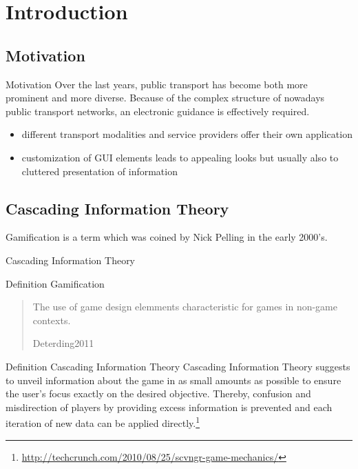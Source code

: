 \section{Introduction}
\subsection{Motivation}

\begin{frame}{Motivation}
Over the last years, public transport has become both more prominent and more diverse. Because of the complex structure of nowadays public transport networks, an electronic guidance is effectively required. \smallskip

\begin{itemize}
\item different transport modalities and service providers offer their own application
\item customization of GUI elements leads to appealing looks but usually also to cluttered presentation of information
\end{itemize}


% 
\end{frame}

\subsection{Cascading Information Theory}

Gamification is a term which was coined by Nick Pelling in the early 2000's. 
\begin{frame}{Cascading Information Theory}
\begin{block}{Definition Gamification}
\blockquote[Deterding2011]{The use of game design elemments characteristic for games in non-game contexts.}
\end{block}\pause

\begin{block}{Definition Cascading Information Theory}
Cascading Information Theory suggests to unveil information about the game in as small amounts as possible to ensure the user's focus exactly on the desired objective. 
Thereby, confusion and misdirection of players by providing excess information is prevented and each iteration of new data can be applied directly.\footnote{\url{http://techcrunch.com/2010/08/25/scvngr-game-mechanics/}}
\end{block}

\end{frame}





